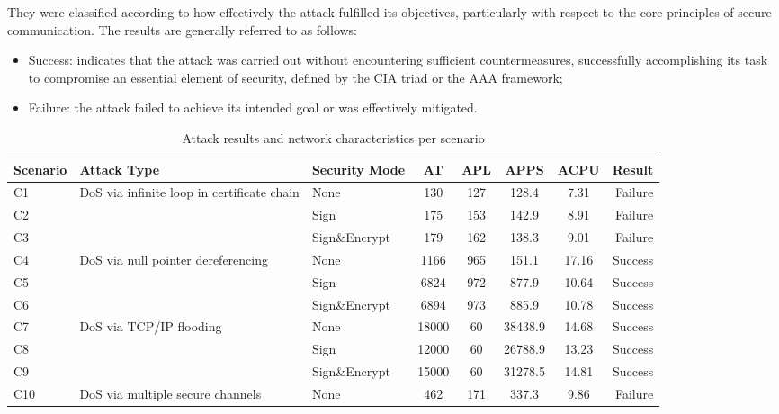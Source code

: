 \documentclass[pdflatex,sn-mathphys-num,iicol]{sn-jnl}%
\begin{document}
They were classified according to how effectively the attack fulfilled its objectives, particularly with respect to the core principles of secure communication. The results are generally referred to as follows:

\begin{itemize}
    \item Success: indicates that the attack was carried out without encountering sufficient countermeasures, successfully accomplishing its task to compromise an essential element of security, defined by the CIA triad or the AAA framework;
    \item Failure: the attack failed to achieve its intended goal or was effectively mitigated.
\end{itemize}

\begin{table}[ht]
    \centering
    \caption{Attack results and network characteristics per scenario}
    \label{tab:combined-results}
    \begin{tabular*}{\textwidth}{@{\extracolsep\fill}l l l c c c c r}
        \toprule
        Scenario & Attack Type & Security Mode & AT\footnotemark[1] & APL\footnotemark[2] & APPS\footnotemark[3] & ACPU\footnotemark[4] & Result \\
        \midrule
        C1 & \multirow{3}{*}{\parbox{2.5cm}{DoS via infinite loop in certificate chain}} & None & 130 & 127 & 128.4 & 7.31 & Failure \\
        C2 & & Sign & 175 & 153 & 142.9 & 8.91 & Failure \\
        C3 & & Sign\&Encrypt & 179 & 162 & 138.3 & 9.01 & Failure \\
        \midrule
        C4 & \multirow{3}{*}{\parbox{2.5cm}{DoS via null pointer dereferencing}} & None & 1166 & 965 & 151.1 & 17.16 & Success \\
        C5 & & Sign & 6824 & 972 & 877.9 & 10.64 & Success \\
        C6 & & Sign\&Encrypt & 6894 & 973 & 885.9 & 10.78 & Success \\
        \midrule
        C7 & \multirow{3}{*}{\parbox{2.5cm}{DoS via TCP/IP flooding}} & None & 18000 & 60 & 38438.9 & 14.68 & Success \\
        C8 & & Sign & 12000 & 60 & 26788.9 & 13.23 & Success \\
        C9 & & Sign\&Encrypt & 15000 & 60 & 31278.5 & 14.81 & Success \\
        \midrule
        C10 & \multirow{3}{*}{\parbox{2.5cm}{DoS via multiple secure channels}} & None & 462 & 171 & 337.3 & 9.86 & Failure \\

\end{tabular*}
\end{table}
\end{document}
